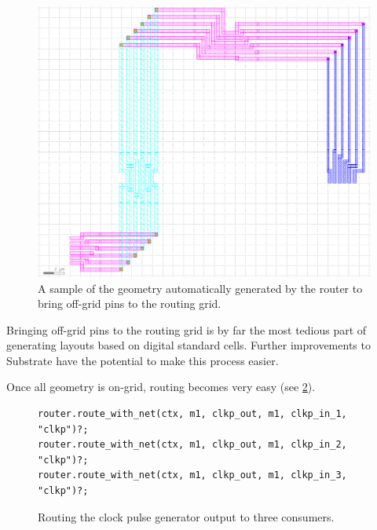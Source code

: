 \begin{figure}[H] \centering
\includegraphics[width=\textwidth]{figures/off_grid_routing.png}
\caption{A sample of the geometry automatically generated by the router to bring off-grid pins to the routing grid. \label{fig:off-grid-routing}}
\end{figure}


Bringing off-grid pins to the routing grid is by far the most tedious part of generating layouts based on
digital standard cells. Further improvements to Substrate have the potential to make this process easier.

Once all geometry is on-grid, routing becomes very easy (see \ref{fig:auto-routing}).

\begin{figure}[H] \centering
\begin{verbatim}
router.route_with_net(ctx, m1, clkp_out, m1, clkp_in_1, "clkp")?;
router.route_with_net(ctx, m1, clkp_out, m1, clkp_in_2, "clkp")?;
router.route_with_net(ctx, m1, clkp_out, m1, clkp_in_3, "clkp")?;
\end{verbatim}
\caption{Routing the clock pulse generator output to three consumers. \label{fig:auto-routing}}
\end{figure}

